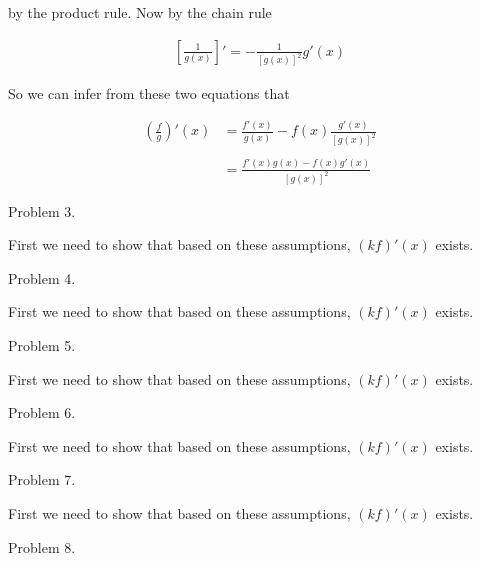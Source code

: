\documentclass{article}
\begin{document}
  by the product rule.  Now by the chain rule

  \begin{align*}
    \left[\frac 1 {g(x)} \right]' = -\frac{1}{[g(x)]^2}g'(x)
  \end{align*}

  So we can infer from these two equations that

  \begin{align*}
    \left(\frac f g \right)'(x) &= \frac{f'(x)}{g(x)}-f(x)\frac{g'(x)}{[g(x)]^2} \\\\
    &= \frac{f'(x)g(x)-f(x)g'(x)}{[g(x)]^2}
  \end{align*}

  \pagebreak

  {\Large \color{Sepia} Problem 3.  }

  \vspace{1cm}

  First we need to show that based on these assumptions, $(kf)'(x)$ exists.

  \pagebreak

  {\Large \color{Sepia} Problem 4.  }

  \vspace{1cm}

  First we need to show that based on these assumptions, $(kf)'(x)$ exists.

  \pagebreak

  {\Large \color{Sepia} Problem 5.  }

  \vspace{1cm}

  First we need to show that based on these assumptions, $(kf)'(x)$ exists.

  \pagebreak

  {\Large \color{Sepia} Problem 6.  }

  \vspace{1cm}

  First we need to show that based on these assumptions, $(kf)'(x)$ exists.

  \pagebreak

  {\Large \color{Sepia} Problem 7.  }

  \vspace{1cm}

  First we need to show that based on these assumptions, $(kf)'(x)$ exists.

  \pagebreak

  {\Large \color{Sepia} Problem 8.  }
\end{document}

